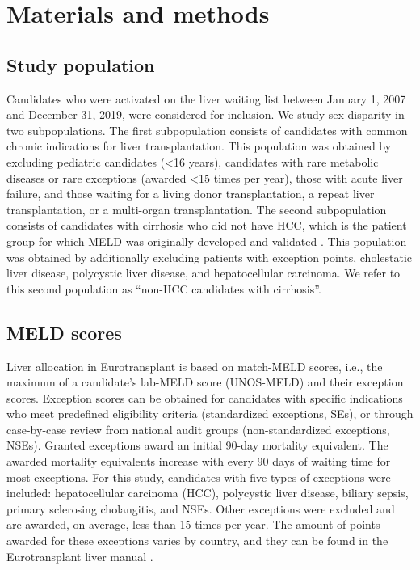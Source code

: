 \documentclass[11pt,twoside,]{book}
\begin{document}
\FloatBarrier
\newpage

\section{Materials and methods}\label{materials-and-methods-1}

\subsection{Study population}\label{study-population}

Candidates who were activated on the liver waiting list
between January 1, 2007 and December 31, 2019, were considered for inclusion.
We study sex disparity in two subpopulations. The first subpopulation consists
of candidates with common chronic indications for liver
transplantation. This population was obtained by excluding pediatric candidates
(\textless 16 years), candidates with rare metabolic diseases or rare exceptions
(awarded \textless 15 times per year), those with acute liver failure, and
those waiting for a living donor transplantation, a repeat liver transplantation,
or a multi-organ transplantation. The second subpopulation consists of candidates
with cirrhosis who did not have HCC, which is the patient group
for which MELD was originally developed and validated \citep{kamathModelPredictSurvival2001}.
This population was obtained by additionally excluding patients with exception points,
cholestatic liver disease, polycystic liver disease, and hepatocellular carcinoma.
We refer to this second population as ``non-HCC candidates with cirrhosis''.

\subsection{MELD scores}\label{meld-scores}

Liver allocation in Eurotransplant is based on match-MELD scores, i.e., the
maximum of a candidate's lab-MELD score (UNOS-MELD) and their exception scores.
Exception scores can be obtained for candidates with specific indications
who meet predefined eligibility criteria (standardized exceptions, SEs), or
through case-by-case review from national audit groups (non-standardized
exceptions, NSEs). Granted exceptions award an initial 90-day mortality
equivalent. The awarded mortality equivalents increase with every 90 days
of waiting time for most exceptions. For this study, candidates
with five types of exceptions were included: hepatocellular carcinoma (HCC),
polycystic liver disease, biliary sepsis, primary sclerosing cholangitis,
and NSEs. Other exceptions were excluded and are awarded, on average, less
than 15 times per year. The amount of points awarded for these exceptions varies by
country, and they can be found in the Eurotransplant liver manual \citep{ETLiverMan2025}.
\end{document}

